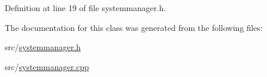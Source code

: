 Definition at line 19 of file systemmanager.\+h.



The documentation for this class was generated from the following files\+:\begin{DoxyCompactItemize}
\item 
src/\mbox{\hyperlink{systemmanager_8h}{systemmanager.\+h}}\item 
src/\mbox{\hyperlink{systemmanager_8cpp}{systemmanager.\+cpp}}\end{DoxyCompactItemize}
